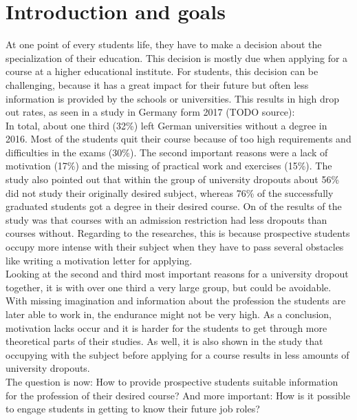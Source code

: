 \chapter{Introduction and goals}
At one point of every students life, they have to make a decision about the specialization of their education. This decision is mostly due when applying for a course at a higher educational institute. For students, this decision can be challenging, because it has a great impact for their future but often less information is provided by the schools or universities. This results in high drop out rates, as seen in a study in Germany form 2017 (TODO source): \\ In total, about one third (32\%) left German universities without a degree in 2016. Most of the students quit their course because of too high requirements and difficulties in the exams (30\%). The second important reasons were a lack of motivation (17\%) and the missing of practical work and exercises (15\%). The study also pointed out that within the group of university dropouts about 56\% did not study their originally desired subject, whereas 76\% of the successfully graduated students got a degree in their desired course. On of the results of the study was that courses with an admission restriction had less dropouts than courses without. Regarding to the researches, this is because prospective students occupy more intense with their subject when they have to pass several obstacles like writing a motivation letter for applying. \\
Looking at the second and third most important reasons for a university dropout together, it is with over one third a very large group, but could be avoidable. With missing imagination and information about the profession the students are later able to work in, the endurance might not be very high. As a conclusion, motivation lacks occur and it is harder for the students to get through more theoretical parts of their studies. As well, it is also shown in the study that occupying with the subject before applying for a course results in less amounts of university dropouts. \\
The question is now: How to provide prospective students suitable information for the profession of their desired course? And more important: How is it possible to engage students in getting to know their future job roles?

